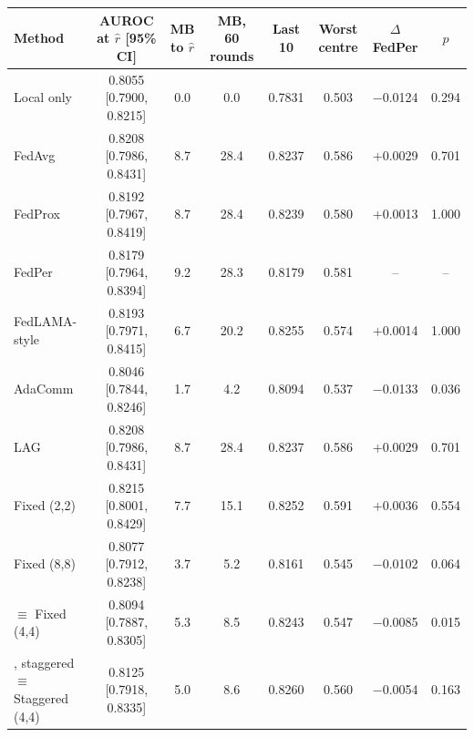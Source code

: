 \begin{tabular}{@{}lccccccc@{}}
\toprule
Method & AUROC at $\hat r$ [95\% CI] & MB to $\hat r$ & MB, 60 rounds & Last 10 & Worst centre & $\Delta$ FedPer & $p$\\
\midrule
Local only & 0.8055 [0.7900, 0.8215] & 0.0 & 0.0 & 0.7831 & 0.503 & \ensuremath{-}0.0124 & 0.294\\
FedAvg & 0.8208 [0.7986, 0.8431] & 8.7 & 28.4 & 0.8237 & 0.586 & \ensuremath{+}0.0029 & 0.701\\
FedProx & 0.8192 [0.7967, 0.8419] & 8.7 & 28.4 & 0.8239 & 0.580 & \ensuremath{+}0.0013 & 1.000\\
FedPer & 0.8179 [0.7964, 0.8394] & 9.2 & 28.3 & 0.8179 & 0.581 & -- & --\\
FedLAMA-style & 0.8193 [0.7971, 0.8415] & 6.7 & 20.2 & 0.8255 & 0.574 & \ensuremath{+}0.0014 & 1.000\\
AdaComm & 0.8046 [0.7844, 0.8246] & 1.7 & 4.2 & 0.8094 & 0.537 & \ensuremath{-}0.0133 & 0.036\\
LAG & 0.8208 [0.7986, 0.8431] & 8.7 & 28.4 & 0.8237 & 0.586 & \ensuremath{+}0.0029 & 0.701\\
Fixed (2,2) & 0.8215 [0.8001, 0.8429] & 7.7 & 15.1 & 0.8252 & 0.591 & \ensuremath{+}0.0036 & 0.554\\
Fixed (8,8) & 0.8077 [0.7912, 0.8238] & 3.7 & 5.2 & 0.8161 & 0.545 & \ensuremath{-}0.0102 & 0.064\\
\tierfed{} $\equiv$ Fixed (4,4) & 0.8094 [0.7887, 0.8305] & 5.3 & 8.5 & 0.8243 & 0.547 & \ensuremath{-}0.0085 & 0.015\\
\tierfed{}, staggered $\equiv$ Staggered (4,4) & 0.8125 [0.7918, 0.8335] & 5.0 & 8.6 & 0.8260 & 0.560 & \ensuremath{-}0.0054 & 0.163\\
\bottomrule
\end{tabular}
